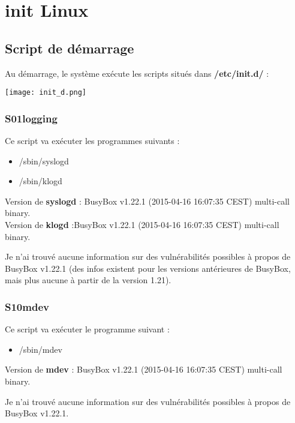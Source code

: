 \chapter{init Linux}
\section{Script de démarrage}

Au démarrage, le système exécute les scripts situés dans \textbf{/etc/init.d/} :

\begin{center} 
\hspace{15cm}
\texttt{[image: init\_d.png]}
\end{center}
\vspace{0.5cm}

\subsection{S01logging}

Ce script va exécuter les programmes suivants :

\begin{itemize}
	\item /sbin/syslogd
	\item /sbin/klogd
\end{itemize}

Version de \textbf{syslogd} : BusyBox v1.22.1 (2015-04-16 16:07:35 CEST) multi-call binary.\\
Version de \textbf{klogd} :BusyBox v1.22.1 (2015-04-16 16:07:35 CEST) multi-call binary.

Je n'ai trouvé aucune information sur des vulnérabilités possibles à propos de BusyBox v1.22.1 (des infos existent pour les versions antérieures de BusyBox, mais plus aucune à partir de la version 1.21).

\subsection{S10mdev}

Ce script va exécuter le programme suivant :

\begin{itemize}
	\item /sbin/mdev
\end{itemize}

Version de \textbf{mdev} : BusyBox v1.22.1 (2015-04-16 16:07:35 CEST) multi-call binary.

Je n'ai trouvé aucune information sur des vulnérabilités possibles à propos de BusyBox v1.22.1.

